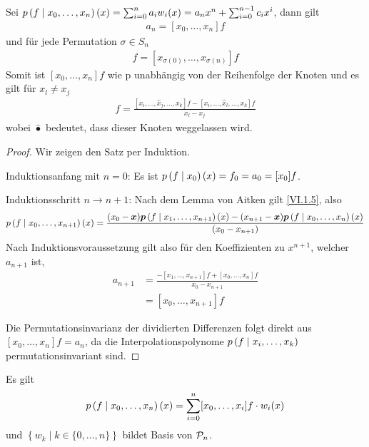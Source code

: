 \begin{Satze}\label{6.1.6}
  Sei $p\left( f \mid x_0,\dotsc,x_n \right)(x)=\sum_{i=0}^{n}a_iw_i(x) = 
  a_nx^n+ \sum_{i=0}^{n-1}c_ix^i$, dann gilt
  \begin{gather*}
    a_n= [x_0, \dotsc, x_n]f
  \end{gather*}
  und für jede Permutation $\sigma \in S_n$
  \begin{gather*}
    [x_0,\dotsc, x_n]f= [x_{\sigma(0)},\dotsc, x_{\sigma(n)}]f
  \end{gather*}
  Somit ist $[x_0, \dotsc, x_n]f$ wie p unabhängig von der
  Reihenfolge der Knoten und es gilt für $x_l\neq x_j$
  \begin{gather}
    [x_i, \dotsc,x_k]f= \frac{[x_i,\dotsc,\widehat{x}_j,\dotsc,x_k]f
      -[x_i,\dotsc,\widehat{x}_l,\dotsc,x_k]f}
    {x_l-x_j}
    \label{VI.1.12}
  \end{gather}
  wobei $\widehat{\bullet}$ bedeutet, dass dieser Knoten
  weggelassen wird.
\end{Satze}

\begin{proof}
  Wir zeigen den Satz per Induktion.

  Induktionsanfang mit $n=0$: Es ist $p\left( f \mid x_0 \right)(x)=f_0=a_0=[x_0]f$.

  Induktionsschritt $n \rightarrow n+1$:
  Nach dem Lemma von Aitken gilt \eqref{VI.1.5}, also 
  \begin{gather*}
    p\left( f \mid x_0,\dotsc,x_{n+1} \right)(x) 
    = \frac{(x_0-{\boldsymbol x})\boldsymbol p\left( f \mid x_1,\dotsc,x_{n+1} \right)(x) -
      (x_{n+1}-{\boldsymbol x})\boldsymbol p\left( f \mid x_0,\dotsc,x_{n} \right)(x)}
    {(x_0-x_{n+1})}
  \end{gather*}
  Nach Induktionsvoraussetzung gilt also 
  für den Koeffizienten zu  $x^{n+1}$, welcher $a_{n+1}$ ist,
  \begin{align*}
    a_{n+1} &= \frac{-[x_1,\dotsc, x_{n+1}]f+[x_0,\dotsc,x_n]f}
              {x_0-x_{n+1}}\\
            & = [x_0, \dotsc , x_{n+1}] f
  \end{align*}

  Die Permutationsinvarianz der dividierten Differenzen 
  folgt direkt aus $[x_0,\dotsc,x_n]f=a_n$,
  da die Interpolationspolynome $p\left( f \mid x_i,\dotsc,x_k \right)$
  permutationsinvariant sind.
\end{proof}


\begin{Satze}\label{6.1.7}
  Es gilt 
  \begin{gather}
    p\left( f \mid x_0,\dotsc,x_n \right)(x) 
    = \sum_{i=0}^{n}[x_0,\dotsc,x_i]f\cdot w_i(x)
    \label{VI.1.13}
  \end{gather}
  und $\left\{w_k\mid k\in \{0,\dotsc,n\}\right\}$
  bildet Basis von $\mathcal{P}_n$.
\end{Satze}

